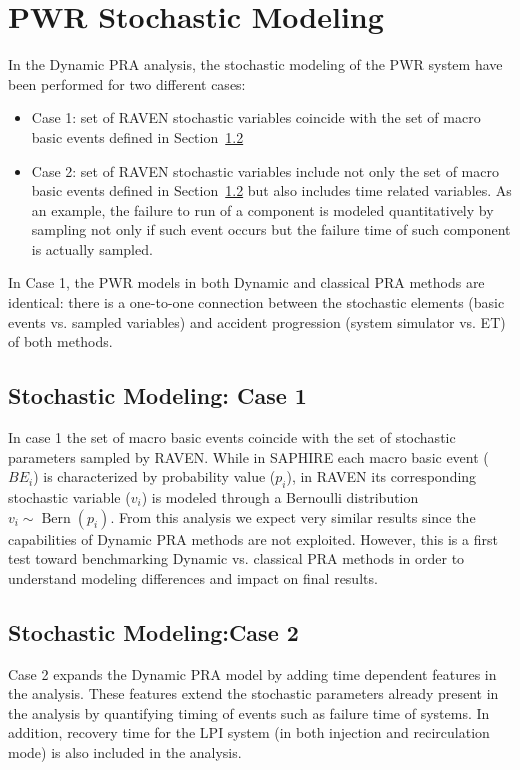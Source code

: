 \section{PWR Stochastic Modeling}
\label{PWRstochasticModeling}

In the Dynamic PRA analysis, the stochastic modeling of the PWR system have been performed
for two different cases:
\begin{itemize}
	\item Case 1: set of RAVEN stochastic variables coincide with the set of macro basic events
	      defined in Section~\ref{}
	\item Case 2: set of RAVEN stochastic variables include not only the set of macro basic events
	      defined in Section~\ref{} but also includes time related variables. As an example, 
	      the failure to run of a component is modeled quantitatively by sampling not only if such 
	      event occurs but the failure time of such component is actually sampled.
\end{itemize}

In Case 1, the PWR models in both Dynamic and classical PRA methods are identical: there is a 
one-to-one connection between the stochastic elements (basic events vs. sampled variables) and
accident progression (system simulator vs. ET) of both methods.

\subsection{Stochastic Modeling: Case 1}

In case 1 the set of macro basic events coincide with the set of stochastic parameters sampled
by RAVEN. While in SAPHIRE each macro basic event ($BE_i$) is characterized by probability value 
($p_i$), in RAVEN its corresponding stochastic variable ($v_i$) is modeled through a Bernoulli 
distribution $v_i \sim \operatorname{Bern}(p_i)$.
From this analysis we expect very similar results since the capabilities of Dynamic PRA methods
are not exploited.
However, this is a first test toward benchmarking Dynamic vs. classical PRA methods in order to 
understand modeling differences and impact on final results.


\subsection{Stochastic Modeling:Case 2}

Case 2 expands the Dynamic PRA model by adding time dependent features in the analysis. 
These features extend the stochastic parameters already present in the analysis by quantifying 
timing of events such as failure time of systems.
In addition, recovery time for the LPI system (in both injection and recirculation mode) is 
also included in the analysis.

